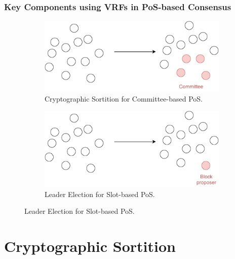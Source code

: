 \documentclass{beamer}
\begin{document}
\begin{frame}
\frametitle{Key Components using VRFs in PoS-based Consensus}

\begin{figure}
    \begin{subfigure}{.45\textwidth}
        \centering
        \includegraphics[width=\linewidth]{./figs/sortition.pdf}  
        \caption{Cryptographic Sortition for Committee-based PoS.}
    \end{subfigure}
    \hfill
    \begin{subfigure}{.45\textwidth}
      \centering
      \includegraphics[width=\linewidth]{./figs/leader-election.pdf}  
      \caption{Leader Election for Slot-based PoS.}
    \end{subfigure}
\end{figure}


\end{frame}





\section{Cryptographic Sortition}
\end{document}
